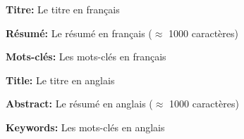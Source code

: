 \cleardoublepage
\thispagestyle{empty}

\noindent
\textbf{Titre:} Le titre en français
\baselineskip

\noindent
\textbf{Résumé:} Le résumé en français ($\approx$ 1000 caractères)
\baselineskip

\noindent
\textbf{Mots-clés:} Les mots-clés en français

\vfill
\begin{otherlanguage}{english}
  \noindent
  \textbf{Title:} Le titre en anglais
  \baselineskip
  
  \noindent
  \textbf{Abstract:} Le résumé en anglais ($\approx$ 1000 caractères)
  \baselineskip
  
  \noindent
  \textbf{Keywords:} Les mots-clés en anglais
\end{otherlanguage}
